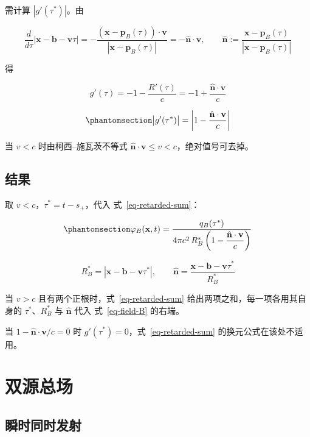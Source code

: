 \documentclass[
  chinese,
  a4paper,
  UTF8,
  12pt,
  oneside,
  openany]{ctexbook}
\theoremstyle{plain}
\theoremstyle{plain}
\theoremstyle{plain}
\theoremstyle{definition}
\theoremstyle{plain}
\theoremstyle{plain}
\theoremstyle{remark}
\begin{document}
需计算 \(|g'(\tau^{*})|\)。由

\[
\frac{d}{d\tau}|\mathbf{x}-\mathbf{b}-\mathbf{v}\tau|
=-\frac{(\mathbf{x}-\mathbf{p}_{B}(\tau))\cdot\mathbf{v}}{|\mathbf{x}-\mathbf{p}_{B}(\tau)|}
=-\hat{\mathbf{n}}\cdot\mathbf{v},
\qquad \hat{\mathbf{n}}:=\frac{\mathbf{x}-\mathbf{p}_{B}(\tau)}{|\mathbf{x}-\mathbf{p}_{B}(\tau)|}
\]

得

\[
g'(\tau)=-1-\frac{R'(\tau)}{c}=-1+\frac{\hat{\mathbf{n}}\cdot\mathbf{v}}{c}
\]

\begin{equation}\protect\phantomsection\label{eq-jacobian}{
\bigl|g'(\tau^{*})\bigr|=\left|1-\frac{\hat{\mathbf{n}}\cdot\mathbf{v}}{c}\right|
}\end{equation}

当 \(v<c\) 时由柯西--施瓦茨不等式
\(\hat{\mathbf{n}}\cdot\mathbf{v}\le v<c\)，绝对值号可去掉。

\subsection{结果}\label{ux7ed3ux679c-2}

取 \(v<c\)，\(\tau^{*}=t-s_{+}\)，代入 式~\ref{eq-retarded-sum}：

\begin{equation}\protect\phantomsection\label{eq-field-B}{
\varphi_{B}(\mathbf{x},t)=\frac{q_{B}(\tau^{*})}{4\pi c^{2}\,R_{B}^{*}\left(1-\dfrac{\hat{\mathbf{n}}\cdot\mathbf{v}}{c}\right)}
}\end{equation}

\[
R_{B}^{*}=|\mathbf{x}-\mathbf{b}-\mathbf{v}\tau^{*}|,\qquad
\hat{\mathbf{n}}=\frac{\mathbf{x}-\mathbf{b}-\mathbf{v}\tau^{*}}{R_{B}^{*}}
\]

当 \(v>c\) 且有两个正根时，式~\ref{eq-retarded-sum}
给出两项之和，每一项各用其自身的 \(\tau^{*}\)、\(R_{B}^{*}\) 与
\(\hat{\mathbf{n}}\) 代入 式~\ref{eq-field-B} 的右端。

当 \(1-\hat{\mathbf{n}}\cdot\mathbf{v}/c=0\) 时
\(g'(\tau^{*})=0\)，式~\ref{eq-retarded-sum} 的换元公式在该处不适用。

\section{双源总场}\label{sec-tsf-total}

\subsection{瞬时同时发射}\label{ux77acux65f6ux540cux65f6ux53d1ux5c04}
\end{document}
